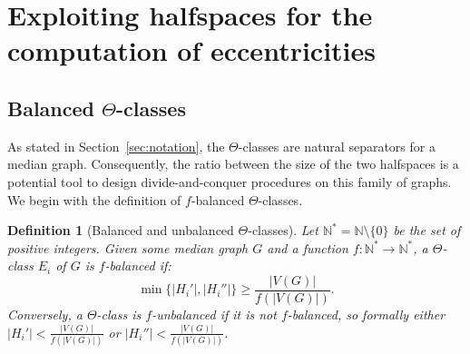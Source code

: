 \documentclass[11pt,letterpaper]{article}
\newtheorem{definition}{Definition}
\newcommand{\set}[1]{\left\{ #1 \right\}}
\begin{document}
\begin{comment}
Conversely, let $Q$ be a hypercube and assume that its signature $X_Q$ is a maximal POF. We suppose that there is a second hypercube $Q' \neq Q$ such that $X_Q = X_{Q'}$. Then, the set $\bigcap_{X_Q} \partial H_i''$ contains at least two elements: the anti-bases of hypercubes $Q$ and $Q'$. Using the same argument as above, we can put in evidence an edge with two endpoints in $\bigcap_{X_Q} \partial H_i''$. The $\Theta$-class of this edge is thus orthogonal of any class $E_i$ of $X_Q$ which defines an isomorphism between $\partial H_i'$ and $\partial H_i''$. Consequently, we obtain a POF superset of $X_Q$, a contradiction.

For any POF $X$, there is at least one hypercube with signature $X$ such that its anti-basis $v$ verifies $\mathcal{E}^-(v) = X$ according to Lemma~\ref{le:pof_hypercube}. In summary, any maximal POF $X$ can be associated with an unique hypercube of signature $X$.
\end{proof}

Figure~\ref{subfig:maximal_pof} illustrates this proof with two squares $Q$ and $Q'$ with the same signature $\set{E_i,E_h}$. One can observe the appearance of a hypercube of larger dimension containing $Q$, giving evidence of the non-maximality of $X_Q$.

The number of maximal hypercubes in a median graph is thus equal to the number of maximal POFs, which is itself at most linear in the number of vertices.
\end{comment}

\section{Exploiting halfspaces for the computation of eccentricities}

\subsection{Balanced $\Theta$-classes}

As stated in Section~\ref{sec:notation}, the $\Theta$-classes are natural separators for a median graph. Consequently, the ratio between the size of the two halfspaces is a potential tool to design divide-and-conquer procedures on this family of graphs. We begin with the definition of $f$-balanced $\Theta$-classes.

\begin{definition}[Balanced and unbalanced $\Theta$-classes]
Let $\mathbb{N}^* = \mathbb{N}\setminus \{0\}$ be the set of positive integers. Given some median graph $G$ and a function $f : \mathbb{N}^* \rightarrow \mathbb{N}^*$, a $\Theta$-class $E_i$ of $G$ is $f$-balanced if:
\begin{equation}\min\{\vert H_i' \vert, \vert H_i'' \vert\} \ge \frac{\vert V(G) \vert}{f(\vert V(G) \vert)}.
\label{eq:balanced}
\end{equation}
Conversely, a $\Theta$-class is $f$-unbalanced if it is not $f$-balanced, so formally either $\vert H_i' \vert < \frac{\vert V(G) \vert}{f(\vert V(G) \vert)}$ or $\vert H_i'' \vert < \frac{\vert V(G) \vert}{f(\vert V(G) \vert)}$.
\label{def:balanced}
\end{definition}
\end{document}
